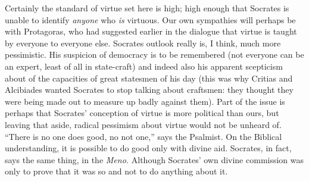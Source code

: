 \documentclass[11pt]{amsart}
\begin{document}
Certainly the standard of virtue set here is high; high enough that
Socrates is unable to identify \emph{anyone} who \emph{is} virtuous.
Our own sympathies will perhaps be with Protagoras, who had suggested
earlier in the dialogue that virtue is taught by everyone to everyone
else. Socrates outlook really is, I think, much more pessimistic. His
suspicion of democracy is to be remembered (not everyone can be an
expert, least of all in state-craft) and indeed also his apparent
scepticism about of the capacities of great statesmen of his day (this
was why Critias and Alcibiades wanted Socrates to stop talking about
craftsmen: they thought they were being made out to measure up badly
against them). Part of the issue is perhaps that Socrates' conception
of virtue is more political than ours, but leaving that aside, radical
pessimism about virtue would not be unheard of. ``There is no one does
good, no not one,'' says the Psalmist. On the Biblical understanding,
it is possible to do good only with divine aid. Socrates, in fact,
says the same thing, in the \emph{Meno.} Although Socrates' own divine
commission was only to prove that it was so and not to do anything
about it.
\end{document}
